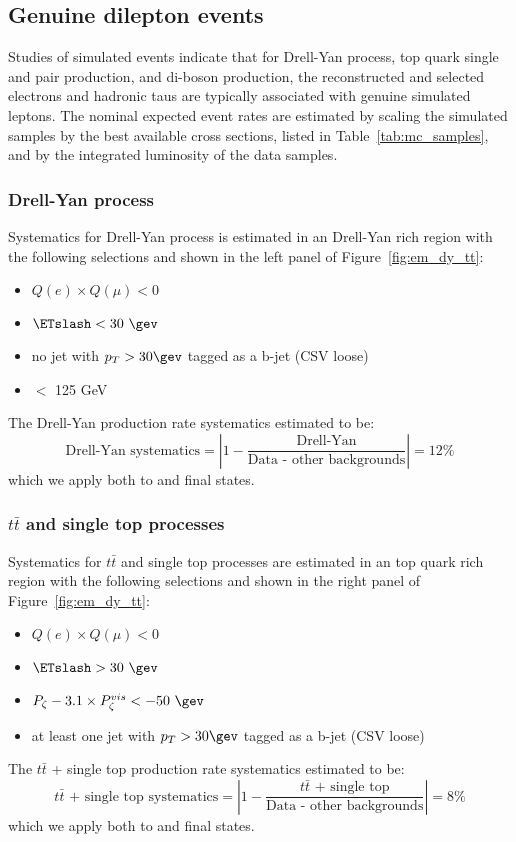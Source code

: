 \subsection{Genuine dilepton events}
Studies of simulated events indicate that for Drell-Yan process, top
quark single and pair production, and di-boson production, the
reconstructed and selected electrons and hadronic taus are typically
associated with genuine simulated leptons.  The nominal expected event
rates are estimated by scaling the simulated samples by the best
available cross sections, listed in Table~\ref{tab:mc_samples}, and by
the integrated luminosity of the data samples.

\subsubsection{Drell-Yan process}\label{sec:em_DY}
Systematics for Drell-Yan process is estimated in an Drell-Yan rich 
region with the following selections and shown in the left panel of 
Figure~\ref{fig:em_dy_tt}:
\begin{itemize}
  \item $Q(e) \times Q(\mu) < 0$
  \item $\ETslash<30~\gev$
  \item no jet with $p_T>30\gev$ tagged as a b-jet (CSV loose)
  \item \meffemu $<$ 125 GeV
\end{itemize}
The Drell-Yan production rate systematics estimated to be:
\begin{equation}\label{eq:DY}
\text{Drell-Yan systematics} = \left| 1 - \frac{\text{Drell-Yan}}{\text{Data - other backgrounds}}\right| = 12\%
\end{equation}
which we apply both to \tetm and \teth final states.

\subsubsection{$t\bar{t}$ and single top processes}\label{sec:em_tt}
Systematics for $t\bar{t}$ and single top processes are estimated in an top quark rich 
region with the following selections and shown in the right panel of 
Figure~\ref{fig:em_dy_tt}:
\begin{itemize}
  \item $Q(e) \times Q(\mu) < 0$
  \item $\ETslash>30~\gev$
  \item $P_{\zeta}- 3.1 \times P_{\zeta}^{vis} < -50~\gev$
  \item at least one jet with $p_T>30\gev$ tagged as a b-jet (CSV loose)
\end{itemize}
The $t\bar{t}$ + single top production rate systematics estimated to be:
\begin{equation}\label{eq:tt}
\text{$t\bar{t}$ + single top systematics} = \left| 1 - \frac{\text{$t\bar{t}$ + single top}}{\text{Data - other backgrounds}}\right| = 8\%
\end{equation}
which we apply both to \tetm and \teth final states.

